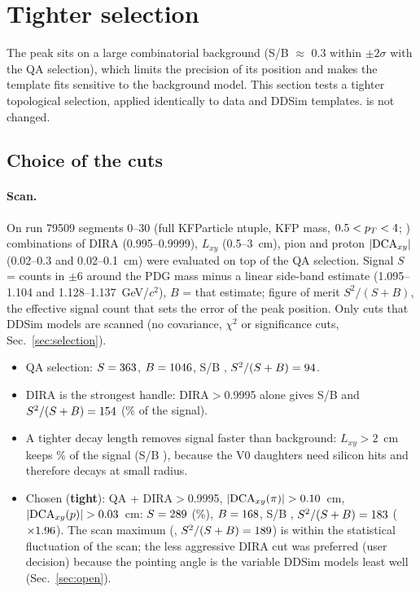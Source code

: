 \section{Tighter \La{} selection}
\label{sec:tight}

The \La{} peak sits on a large combinatorial background (S/B $\approx$ 0.3 within $\pm2\sigma$ with the QA selection), which limits
the precision of its position and makes the \La{} template fits sensitive to the background model. This section tests a tighter
\La{} topological selection, applied identically to data and DDSim templates. \Ks{} is not changed.

\subsection{Choice of the cuts}

\paragraph{Scan.} On run 79509 segments 0--30 (full KFParticle ntuple, KFP mass, $0.5<p_T<4$\gevc;
) \ScanNCuts{} combinations of DIRA (0.995--0.9999), $L_{xy}$ (0.5--3~cm), pion and proton
$|{\rm DCA}_{xy}|$ (0.02--0.3 and 0.02--0.1~cm) were evaluated on top of the QA selection. Signal $S$ = counts in
$\pm6$\mevcc{} around the PDG mass minus a linear side-band estimate (1.095--1.104 and 1.128--1.137~GeV/$c^2$), $B$ = that estimate;
figure of merit $S^2/(S+B)$, the effective signal count that sets the error of the peak position. Only cuts that DDSim models are
scanned (no covariance, $\chi^2$ or significance cuts, Sec.~\ref{sec:selection}).
\begin{itemize}
\item QA selection: $S=363$, $B=1046$, S/B \ScanBaseSB, $S^2/(S+B)=94$.
\item DIRA is the strongest handle: DIRA$>$0.9995 alone gives S/B \ScanDiraSB{} and $S^2/(S+B)=154$ (\ScanDiraKeep\% of
  the signal).
\item A tighter decay length removes signal faster than background: $L_{xy}>2$~cm keeps \ScanLxyKeep\% of the signal
  (S/B \ScanLxySB), because the V0 daughters need silicon hits and therefore decays at small radius.
\item Chosen (\textbf{tight}): QA + DIRA$>$0.9995, $|{\rm DCA}_{xy}(\pi)|>0.10$~cm, $|{\rm DCA}_{xy}(p)|>0.03$~cm: $S=289$
  (\ScanSelKeep\%), $B=168$, S/B \ScanSelSB, $S^2/(S+B)=183$ ($\times1.96$). The scan maximum
  (\ScanBestCut, $S^2/(S+B)=189$) is within the statistical fluctuation of the scan; the less aggressive DIRA cut was
  preferred (user decision) because the pointing angle is the variable DDSim models least well (Sec.~\ref{sec:open}).
\end{itemize}

